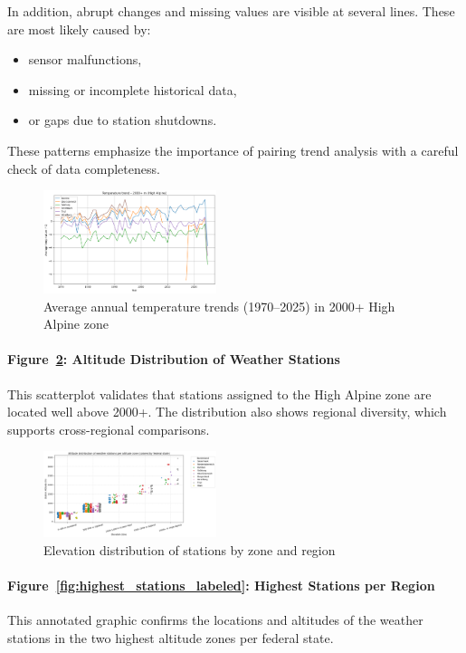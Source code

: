 In addition, abrupt changes and missing values are visible at several lines. These are most likely caused by:
\begin{itemize}
    \item sensor malfunctions,
    \item missing or incomplete historical data,
    \item or gaps due to station shutdowns.
\end{itemize}
These patterns emphasize the importance of pairing trend analysis with a careful check of data completeness.

\begin{figure}[ht]
  \centering
    \includegraphics[width=0.45\textwidth]{img/temptrend_highalpine.png}
  \caption{Average annual temperature trends (1970–2025) in 2000+ High Alpine zone}
    \label{fig:temptrend_highalpine}
\end{figure}

\paragraph{Figure~\ref{fig:station_distribution_highalpine}: Altitude Distribution of Weather Stations}
This scatterplot validates that stations assigned to the High Alpine zone are located well above 2000+. The distribution also shows regional diversity, which supports cross-regional comparisons.

\begin{figure}[ht]
    \centering
    \includegraphics[width=0.45\textwidth]{img/station_distribution_highalpine.png}
    \caption{Elevation distribution of stations by zone and region}
    \label{fig:station_distribution_highalpine}
\end{figure}

\paragraph{Figure~\ref{fig:highest_stations_labeled}: Highest Stations per Region}
This annotated graphic confirms the locations and altitudes of the weather stations in the two highest altitude zones per federal state.

